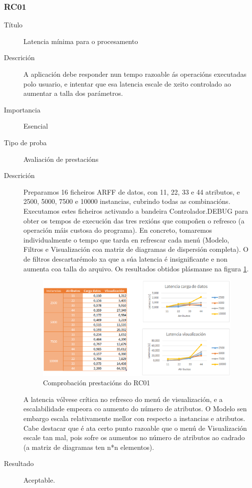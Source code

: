 \subsubsection*{RC01}
\begin{description}
\item[Título] \hfill
Latencia mínima para o procesamento
\item[Descrición] \hfill
A aplicación debe responder nun tempo razoable ás operacións executadas polo usuario, e intentar que esa latencia escale de xeito controlado ao aumentar a talla dos parámetros.
\item[Importancia] \hfill
Esencial
\item[Tipo de proba] \hfill
Avaliación de prestacións
\item[Descrición]
Preparamos 16 ficheiros ARFF de datos, con 11, 22, 33 e 44 atributos, e 2500, 5000, 7500 e 10000 instancias, cubrindo todas as combinacións. Executamos estes ficheiros activando a bandeira Controlador.DEBUG para obter os tempos de execución das tres rexións que compoñen o refresco (a operación máis custosa do programa). En concreto, tomaremos individualmente o tempo que tarda en refrescar cada menú (Modelo, Filtros e Visualización coa matriz de diagramas de dispersión completa). O de filtros descartarémolo xa que a súa latencia é insignificante e non aumenta coa talla do arquivo. Os resultados obtidos plásmanse na figura \ref{eficiencia}.

\begin{figure}
\centering
\includegraphics[width=\textwidth,height=\textheight,keepaspectratio]{figuras/eficiencia}
\caption{Comprobación prestacións do RC01}
\label{eficiencia}
\end{figure}

A latencia vólvese crítica no refresco do menú de visualización, e a escalabilidade empeora co aumento do número de atributos. O Modelo sen embargo escala relativamente mellor con respecto a instancias e atributos. Cabe destacar que é ata certo punto razoable que o menú de Visualización escale tan mal, pois sofre os aumentos no número de atributos ao cadrado (a matriz de diagramas ten n*n elementos).
\item[Resultado]
Aceptable.
\end{description}

